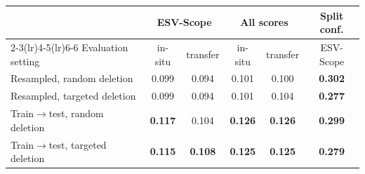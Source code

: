 \setlength{\tabcolsep}{2.5pt}
\begin{tabular}{lccccc}
\toprule
 & \multicolumn{2}{c}{ESV-Scope} & \multicolumn{2}{c}{All scores} & Split conf. \\
\cmidrule(lr){2-3}\cmidrule(lr){4-5}\cmidrule(lr){6-6}
Evaluation setting & in-situ & transfer & in-situ & transfer & ESV-Scope \\
\midrule
Resampled, random deletion & 0.099 & 0.094 & 0.101 & 0.100 & \textbf{0.302} \\
Resampled, targeted deletion & 0.099 & 0.094 & 0.101 & 0.104 & \textbf{0.277} \\
Train$\to$test, random deletion & \textbf{0.117} & 0.104 & \textbf{0.126} & \textbf{0.126} & \textbf{0.299} \\
Train$\to$test, targeted deletion & \textbf{0.115} & \textbf{0.108} & \textbf{0.125} & \textbf{0.125} & \textbf{0.279} \\
\bottomrule
\end{tabular}

